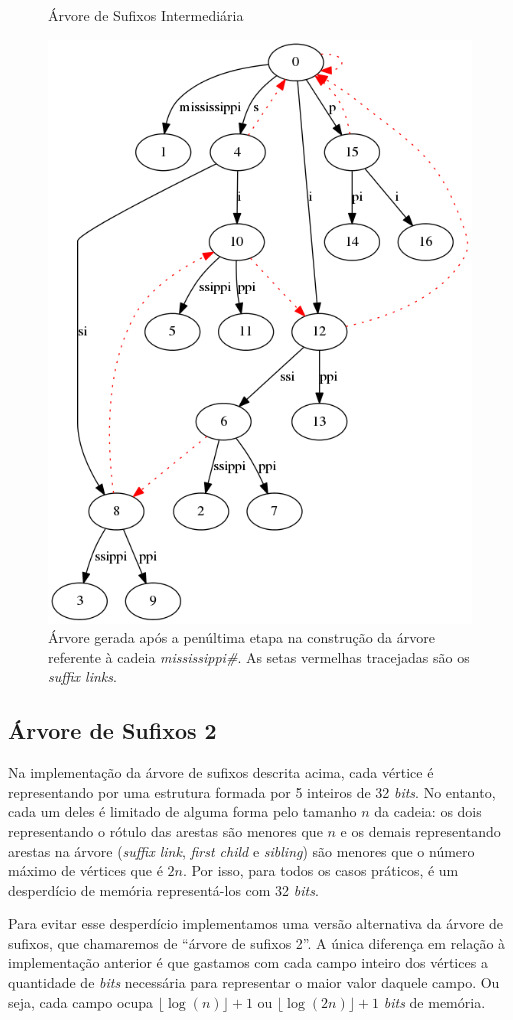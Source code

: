 \documentclass[]{article}
\begin{document}
\begin{figure}
\begin{center}
	{\centering Árvore de Sufixos Intermediária\par}
	\includegraphics[width=.5\textwidth]{images/tree}
\end{center}

\caption{Árvore gerada após a penúltima etapa na construção da árvore referente à cadeia \textit{mississippi\#}. As setas vermelhas tracejadas são os \textit{suffix links}.}
\label{fig:tree}
\end{figure}

\subsection{Árvore de Sufixos 2}

Na implementação da árvore de sufixos descrita acima, cada vértice é representando por uma estrutura formada por 5 inteiros de 32 \textit{bits}. No entanto, cada um deles é limitado de alguma forma pelo tamanho $n$ da cadeia: os dois representando o rótulo das arestas são menores que $n$ e os demais representando arestas na árvore (\textit{suffix link}, \textit{first child} e \textit{sibling}) são menores que o número máximo de vértices que é $2n$. Por isso, para todos os casos práticos, é um desperdício de memória representá-los com 32 \textit{bits}.

Para evitar esse desperdício implementamos uma versão alternativa da árvore de sufixos, que chamaremos de ``árvore de sufixos 2''. A única diferença em relação à implementação anterior é que gastamos com cada campo inteiro dos vértices a quantidade de \textit{bits} necessária para representar o maior valor daquele campo. Ou seja, cada campo ocupa $\lfloor\log(n)\rfloor+1$ ou $\lfloor\log(2n)\rfloor+1$ \textit{bits} de memória.
\end{document}
